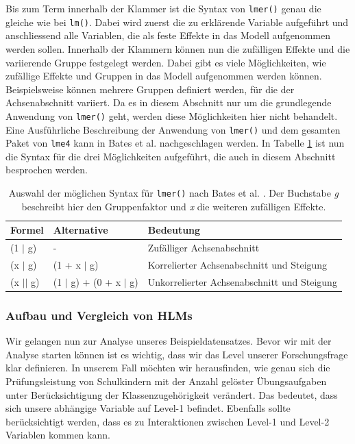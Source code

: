 \documentclass[12pt]{article}\usepackage[]{graphicx}\usepackage[]{color}
\begin{document}
Bis zum Term innerhalb der Klammer ist die Syntax von \texttt{lmer()} genau die gleiche wie bei \texttt{lm()}. Dabei wird zuerst die zu erklärende Variable aufgeführt und anschliessend alle Variablen, die als feste Effekte in das Modell aufgenommen werden sollen. Innerhalb der Klammern können nun die zufälligen Effekte und die variierende Gruppe festgelegt werden. Dabei gibt es viele Möglichkeiten, wie zufällige Effekte und Gruppen in das Modell aufgenommen werden können. Beispielsweise können mehrere Gruppen definiert werden, für die der Achsenabschnitt variiert. Da es in diesem Abschnitt nur um die grundlegende Anwendung von \texttt{lmer()} geht, werden diese Möglichkeiten hier nicht behandelt. Eine Ausführliche Beschreibung der Anwendung von \texttt{lmer()} und dem gesamten Paket von \texttt{lme4} kann in Bates et al. \citeyearpar{batesetal2015lme4} nachgeschlagen werden. In Tabelle \ref{tab:lmersyntax} ist nun die Syntax für die drei Möglichkeiten aufgeführt, die auch in diesem Abschnitt besprochen werden.
\begin{table}[ht] 
\centering
\begin{threeparttable}
\caption{Auswahl der möglichen Syntax für \texttt{lmer()} nach Bates et al. \citeyearpar{batesetal2015lme4}. Der Buchstabe \textit{g} beschreibt hier den Gruppenfaktor und \textit{x} die weiteren zufälligen Effekte.}
\begin{tabular}{lll}
 	\toprule
	Formel & Alternative & Bedeutung\\ 
  	\midrule
	(1 $|$ g)	& - 		& Zufälliger Achsenabschnitt \\
	(x $|$ g) 	& (1 + x $|$ g)	& Korrelierter Achsenabschnitt und Steigung \\
	(x $||$ g) & (1 $|$ g) + (0 + x $|$ g)	& Unkorrelierter Achsenabschnitt und Steigung\\
  	\bottomrule
\end{tabular}
\label{tab:lmersyntax}
\end{threeparttable}
\end{table}

\subsubsection{Aufbau und Vergleich von HLMs} \label{section:hlm_r}
\singlespacing

Wir gelangen nun zur Analyse unseres Beispieldatensatzes. Bevor wir mit der Analyse starten können ist es wichtig, dass wir das Level unserer Forschungsfrage klar definieren. In unserem Fall möchten wir herausfinden, wie genau sich die Prüfungsleistung von Schulkindern mit der Anzahl gelöster Übungsaufgaben unter Berücksichtigung der Klassenzugehörigkeit verändert. Das bedeutet, dass sich unsere abhängige Variable auf Level-1 befindet. Ebenfalls sollte berücksichtigt werden, dass es zu Interaktionen zwischen Level-1 und Level-2 Variablen kommen kann.
\end{document}
